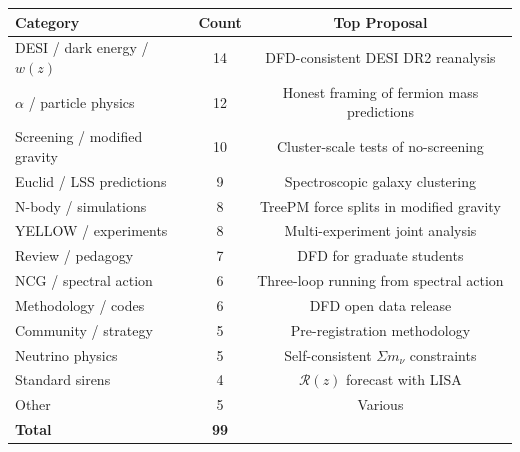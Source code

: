 \documentclass[11pt,a4paper]{article}
\begin{document}
\begin{center}
\begin{tabular}{lcc}
\toprule
\textbf{Category} & \textbf{Count} & \textbf{Top Proposal} \\
\midrule
DESI / dark energy / $w(z)$ & 14 & DFD-consistent DESI DR2 reanalysis \\
$\alpha$ / particle physics & 12 & Honest framing of fermion mass predictions \\
Screening / modified gravity & 10 & Cluster-scale tests of no-screening \\
Euclid / LSS predictions & 9 & Spectroscopic galaxy clustering \\
N-body / simulations & 8 & TreePM force splits in modified gravity \\
YELLOW / experiments & 8 & Multi-experiment joint analysis \\
Review / pedagogy & 7 & DFD for graduate students \\
NCG / spectral action & 6 & Three-loop running from spectral action \\
Methodology / codes & 6 & DFD open data release \\
Community / strategy & 5 & Pre-registration methodology \\
Neutrino physics & 5 & Self-consistent $\Sigma m_\nu$ constraints \\
Standard sirens & 4 & $\mathcal{R}(z)$ forecast with LISA \\
Other & 5 & Various \\
\midrule
\textbf{Total} & \textbf{99} & \\
\bottomrule
\end{tabular}
\end{center}
\end{document}
